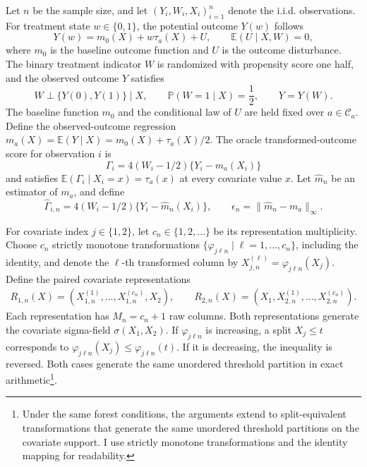 \documentclass[12pt]{article}
\newcommand{\E}{\mathbb E}
\newcommand{\Prb}{\mathbb P}
\begin{document}
Let \(n\) be the sample size, and let \((Y_i,W_i,X_i)_{i=1}^n\) denote the i.i.d. observations. For treatment state \(w\in\{0,1\}\), the potential outcome \(Y(w)\) follows
\begin{equation}\label{eq:dgp}
Y(w)=m_0(X)+w\tau_a(X)+U,
\qquad
\E(U\mid X,W)=0,
\end{equation}
where \(m_0\) is the baseline outcome function and \(U\) is the outcome disturbance. The binary treatment indicator \(W\) is randomized with propensity score one half, and the observed outcome \(Y\) satisfies
\[
W\perp\{Y(0),Y(1)\}\mid X,
\qquad
\Prb(W=1\mid X)=\frac12,
\qquad
Y=Y(W).
\]
The baseline function \(m_0\) and the conditional law of \(U\) are held fixed over \(a\in\mathcal C_a\). Define the observed-outcome regression \(m_a(X)=\E(Y\mid X)=m_0(X)+\tau_a(X)/2\). The oracle transformed-outcome score for observation \(i\) is
\begin{equation}\label{eq:score}
\Gamma_i=4(W_i-1/2)\{Y_i-m_a(X_i)\}
\end{equation}
and satisfies \(\E(\Gamma_i\mid X_i=x)=\tau_a(x)\) at every covariate value \(x\). Let \(\widehat m_n\) be an estimator of \(m_a\), and define
\[
\widehat\Gamma_{i,n}
=4(W_i-1/2)\{Y_i-\widehat m_n(X_i)\},
\qquad
\epsilon_n=\|\widehat m_n-m_a\|_\infty.
\]

For covariate index \(j\in\{1,2\}\), let \(c_n\in\{1,2,\ldots\}\) be its representation multiplicity. Choose \(c_n\) strictly monotone transformations \(\{\varphi_{j\ell n}\mid\ell=1,\ldots,c_n\}\), including the identity, and denote the \(\ell\)-th transformed column by \(X_{j,n}^{(\ell)}=\varphi_{j\ell n}(X_j)\). Define the paired covariate representations
\begin{align*}
  R_{1,n}(X)=(X_{1,n}^{(1)},\ldots,X_{1,n}^{(c_n)},X_2),\qquad R_{2,n}(X) =(X_1,X_{2,n}^{(1)},\ldots,X_{2,n}^{(c_n)}).
\end{align*}
Each representation has \(M_n=c_n+1\) raw columns. Both representations generate the covariate sigma-field \(\sigma(X_1,X_2)\). If \(\varphi_{j\ell n}\) is increasing, a split \(X_j\le t\) corresponds to \(\varphi_{j\ell n}(X_j)\le\varphi_{j\ell n}(t)\). If it is decreasing, the inequality is reversed. Both cases generate the same unordered threshold partition in exact arithmetic\footnote{Under the same forest conditions, the arguments extend to split-equivalent transformations that generate the same unordered threshold partitions on the covariate support. I use strictly monotone transformations and the identity mapping for readability.}.
\end{document}

